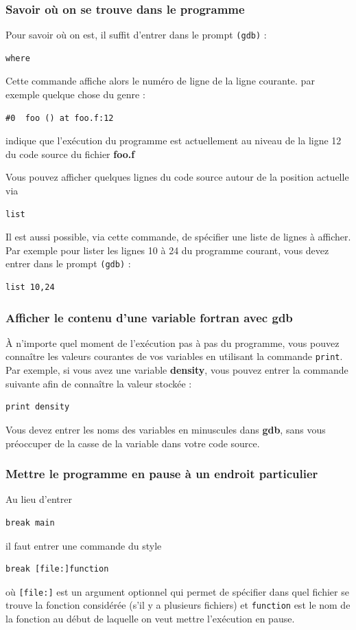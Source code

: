 \documentclass[a4paper,twoside]{article}
\begin{document}
\subsubsection{Savoir où on se trouve dans le programme}
Pour savoir où on est, il suffit d'entrer dans le prompt \texttt{(gdb)} :
\begin{verbatim}
where
\end{verbatim}
Cette commande affiche alors le numéro de ligne de la ligne courante. par exemple quelque chose du genre : 
\begin{verbatim}
#0  foo () at foo.f:12
\end{verbatim}
indique que l'exécution du programme est actuellement au niveau de la ligne 12 du code source du fichier \textbf{foo.f}

\bigskip

Vous pouvez afficher quelques lignes du code source autour de la position actuelle via 
\begin{verbatim}
list
\end{verbatim}

Il est aussi possible, via cette commande, de spécifier une liste de lignes à afficher. Par exemple pour lister les lignes 10 à 24 du programme courant, vous devez entrer dans le prompt \texttt{(gdb)} :
\begin{verbatim}
list 10,24
\end{verbatim}

\subsubsection{Afficher le contenu d'une variable fortran avec gdb}
À n'importe quel moment de l'exécution pas à pas du programme, vous pouvez connaître les valeurs courantes de vos variables en utilisant la commande \texttt{print}. Par exemple, si vous avez une variable \textbf{density}, vous pouvez entrer la commande suivante afin de connaître la valeur stockée : 
\begin{verbatim}
print density
\end{verbatim}
 
\begin{attention}
Vous devez entrer les noms des variables en minuscules dans \textbf{gdb}, sans vous préoccuper de la casse de la variable dans votre code source.
\end{attention}

\subsubsection{Mettre le programme en pause à un endroit particulier}
Au lieu d'entrer 
\begin{verbatim}
break main
\end{verbatim}
il faut entrer une commande du style
\begin{verbatim}
break [file:]function
\end{verbatim}
où \texttt{[file:]} est un argument optionnel qui permet de spécifier dans quel fichier se trouve la fonction considérée (s'il y a plusieurs fichiers) et \texttt{function} est le nom de la fonction au début de laquelle on veut mettre l'exécution en pause.
\end{document}
